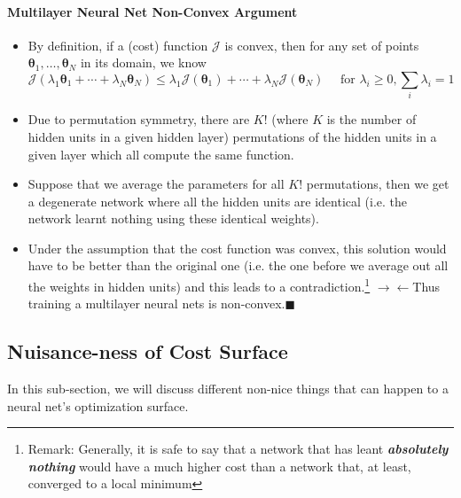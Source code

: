 \documentclass[11pt]{article}
\newcommand{\contradiction}{$\longrightarrow\!\longleftarrow$}
\newcommand{\qed}{\hfill $\blacksquare$}
\begin{document}
\paragraph{Multilayer Neural Net Non-Convex Argument}
\begin{itemize}
    \item By definition, if a (cost) function $\mathcal{J}$ is convex, then for any set of points $\boldsymbol{\theta}_{1}, \dots, \boldsymbol{\theta}_{N}$ in its domain, we know
    \begin{equation}
        \mathcal{J}\left(\lambda_{1} \boldsymbol{\theta}_{1}+\cdots+\lambda_{N} \boldsymbol{\theta}_{N}\right) \leq \lambda_{1} \mathcal{J}\left(\boldsymbol{\theta}_{1}\right)+\cdots+\lambda_{N} \mathcal{J}\left(\boldsymbol{\theta}_{N}\right) \quad \text { for } \lambda_{i} \geq 0, \sum_{i} \lambda_{i}=1
    \end{equation}
    \item Due to permutation symmetry, there are $K!$ (where $K$ is the number of hidden units in a given hidden layer) permutations of the hidden units in a given layer which all compute the same function. 
    \item Suppose that we average the parameters for all $K!$ permutations, then we get a degenerate network where all the hidden units are identical (i.e. the network learnt nothing using these identical weights).
    \item Under the assumption that the cost function was convex, this solution would have to be better than the original one (i.e. the one before we average out all the weights in hidden units) and this leads to a contradiction.\footnote{Remark: Generally, it is safe to say that a network that has leant\textit{\textbf{ absolutely nothing }}would have a much higher cost than a network that, at least, converged to a local minimum} \contradiction Thus training a multilayer neural nets is non-convex.\qed
\end{itemize}

\subsection{Nuisance-ness of Cost Surface}
In this sub-section, we will discuss different non-nice things that can happen to a neural net's optimization surface. 
\end{document}
